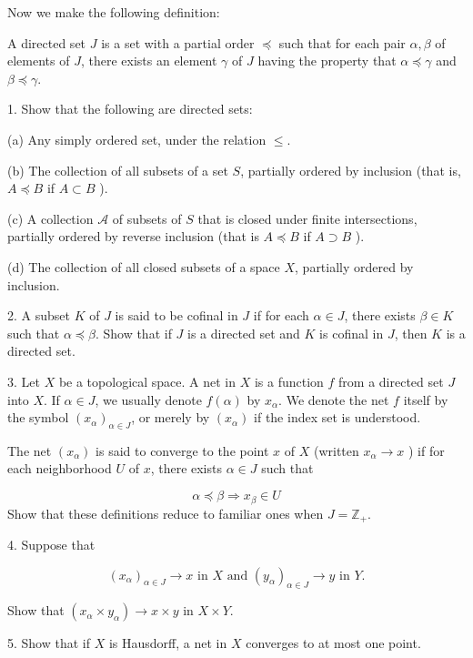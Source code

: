 Now we make the following definition:

A directed set \(J\) is a set with a partial order \(\preccurlyeq\) such that for each pair \(\alpha ,\beta\) of elements of \(J\), there exists an element \(\gamma\) of \(J\) having the property that \(\alpha \preccurlyeq \gamma\) and \(\beta \preccurlyeq \gamma\).

1. Show that the following are directed sets:

(a) Any simply ordered set, under the relation \(\leq\).

(b) The collection of all subsets of a set \(S\), partially ordered by inclusion (that is, \(A \preccurlyeq B\) if \(A \subset B\) ).

(c) A collection \(\mathcal{A}\) of subsets of \(S\) that is closed under finite intersections, partially ordered by reverse inclusion (that is \(A \preccurlyeq B\) if \(A \supset B\) ).

(d) The collection of all closed subsets of a space \(X\), partially ordered by inclusion.

2. A subset \(K\) of \(J\) is said to be cofinal in \(J\) if for each \(\alpha \in J\), there exists \(\beta \in K\) such that \(\alpha \preccurlyeq \beta\). Show that if \(J\) is a directed set and \(K\) is cofinal in \(J\), then \(K\) is a directed set.

3. Let \(X\) be a topological space. A net in \(X\) is a function \(f\) from a directed set \(J\) into \(X\). If \(\alpha \in J\), we usually denote \(f( \alpha )\) by \(x_{\alpha }\). We denote the net \(f\) itself by the symbol \({( x_{\alpha }) }_{\alpha \in J}\), or merely by \(( x_{\alpha })\) if the index set is understood.

The net \(( x_{\alpha })\) is said to converge to the point \(x\) of \(X\) (written \(x_{\alpha } \rightarrow x\) ) if for each neighborhood \(U\) of \(x\), there exists \(\alpha \in J\) such that

\[
\alpha \preccurlyeq \beta \Rightarrow {x}_{\beta } \in U
\]
Show that these definitions reduce to familiar ones when \(J = \mathbb{Z}_{ + }\).

4. Suppose that

\[
{( x_{\alpha }) }_{\alpha \in J} \rightarrow x\text{ in }X\text{ and }{( y_{\alpha }) }_{\alpha \in J} \rightarrow y\text{ in }Y.
\]

Show that \(( {x_{\alpha } \times {y}_{\alpha }}) \rightarrow x \times y\) in \(X \times Y\).

5. Show that if \(X\) is Hausdorff, a net in \(X\) converges to at most one point.

